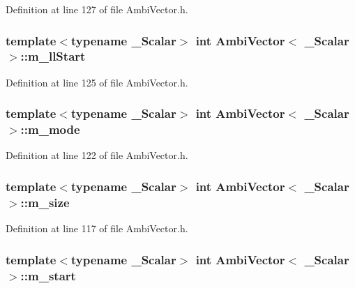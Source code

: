 Definition at line 127 of file Ambi\-Vector.\-h.

\hypertarget{class_ambi_vector_a86993e2686334e95b36b8e0995107bc5}{
\subsubsection[{m\-\_\-ll\-Start}]{\setlength{\rightskip}{0pt plus 5cm}template$<$typename \-\_\-\-Scalar$>$ {\bf int} {\bf Ambi\-Vector}$<$ \-\_\-\-Scalar $>$\-::m\-\_\-ll\-Start\hspace{0.3cm}{\ttfamily [protected]}}}\label{class_ambi_vector_a86993e2686334e95b36b8e0995107bc5}


Definition at line 125 of file Ambi\-Vector.\-h.

\hypertarget{class_ambi_vector_a78d7db3effaa0fcb9b71fe061d66c00d}{
\subsubsection[{m\-\_\-mode}]{\setlength{\rightskip}{0pt plus 5cm}template$<$typename \-\_\-\-Scalar$>$ {\bf int} {\bf Ambi\-Vector}$<$ \-\_\-\-Scalar $>$\-::m\-\_\-mode\hspace{0.3cm}{\ttfamily [protected]}}}\label{class_ambi_vector_a78d7db3effaa0fcb9b71fe061d66c00d}


Definition at line 122 of file Ambi\-Vector.\-h.

\hypertarget{class_ambi_vector_a57b56d38a69c41a728f208a73e13c0ed}{
\subsubsection[{m\-\_\-size}]{\setlength{\rightskip}{0pt plus 5cm}template$<$typename \-\_\-\-Scalar$>$ {\bf int} {\bf Ambi\-Vector}$<$ \-\_\-\-Scalar $>$\-::m\-\_\-size\hspace{0.3cm}{\ttfamily [protected]}}}\label{class_ambi_vector_a57b56d38a69c41a728f208a73e13c0ed}


Definition at line 117 of file Ambi\-Vector.\-h.

\hypertarget{class_ambi_vector_a54f46940c9a006b2c3742941df1cebc7}{
\subsubsection[{m\-\_\-start}]{\setlength{\rightskip}{0pt plus 5cm}template$<$typename \-\_\-\-Scalar$>$ {\bf int} {\bf Ambi\-Vector}$<$ \-\_\-\-Scalar $>$\-::m\-\_\-start\hspace{0.3cm}{\ttfamily [protected]}}}\label{class_ambi_vector_a54f46940c9a006b2c3742941df1cebc7}


